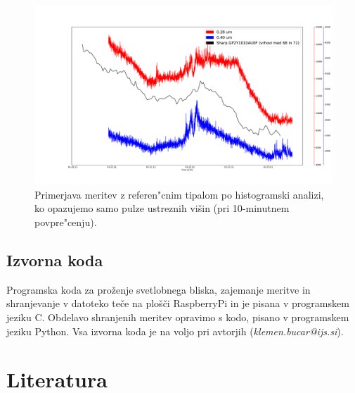 \documentclass[12pt,a4paper]{article}
\begin{document}
\begin{figure}[H]
	\begin{center}
		\includegraphics[width=16cm]{hist_comparison.pdf}
		\caption{Primerjava meritev z referen"cnim tipalom po histogramski analizi, ko opazujemo samo pulze ustreznih višin (pri 10-minutnem povpre"cenju).}
		\label{hist_comparison}
	\end{center}
\end{figure}

\clearpage

\begin{appendices}
	\section{Izvorna koda}

Programska koda za proženje svetlobnega bliska, zajemanje meritve in shranjevanje v datoteko teče na plošči RaspberryPi in je pisana v programskem jeziku C.
Obdelavo shranjenih meritev opravimo s kodo, pisano v programskem jeziku Python. 
Vsa izvorna koda je na voljo pri avtorjih (\emph{klemen.bucar@ijs.si}).


\end{appendices}
\clearpage

\section{Literatura}

\printbibliography[heading=none]
\end{document}
